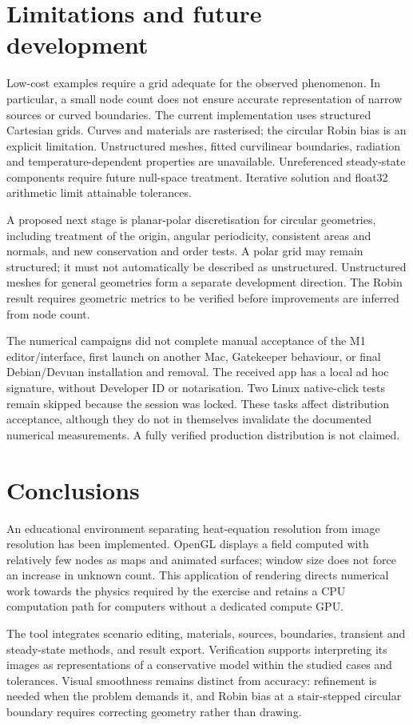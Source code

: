 \documentclass[11pt,a4paper]{article}
\begin{document}
\section{Limitations and future development}
Low-cost examples require a grid adequate for the observed phenomenon. In particular, a small node count does not ensure accurate representation of narrow sources or curved boundaries. The current implementation uses structured Cartesian grids. Curves and materials are rasterised; the circular Robin bias is an explicit limitation. Unstructured meshes, fitted curvilinear boundaries, radiation and temperature-dependent properties are unavailable. Unreferenced steady-state components require future null-space treatment. Iterative solution and float32 arithmetic limit attainable tolerances.

A proposed next stage is planar-polar discretisation for circular geometries, including treatment of the origin, angular periodicity, consistent areas and normals, and new conservation and order tests. A polar grid may remain structured; it must not automatically be described as unstructured. Unstructured meshes for general geometries form a separate development direction. The Robin result requires geometric metrics to be verified before improvements are inferred from node count.

The numerical campaigns did not complete manual acceptance of the M1 editor/interface, first launch on another Mac, Gatekeeper behaviour, or final Debian/Devuan installation and removal. The received app has a local ad hoc signature, without Developer ID or notarisation. Two Linux native-click tests remain skipped because the session was locked. These tasks affect distribution acceptance, although they do not in themselves invalidate the documented numerical measurements. A fully verified production distribution is not claimed.

\section{Conclusions}
An educational environment separating heat-equation resolution from image resolution has been implemented. OpenGL displays a field computed with relatively few nodes as maps and animated surfaces; window size does not force an increase in unknown count. This application of rendering directs numerical work towards the physics required by the exercise and retains a CPU computation path for computers without a dedicated compute GPU.

The tool integrates scenario editing, materials, sources, boundaries, transient and steady-state methods, and result export. Verification supports interpreting its images as representations of a conservative model within the studied cases and tolerances. Visual smoothness remains distinct from accuracy: refinement is needed when the problem demands it, and Robin bias at a stair-stepped circular boundary requires correcting geometry rather than drawing.
\end{document}
